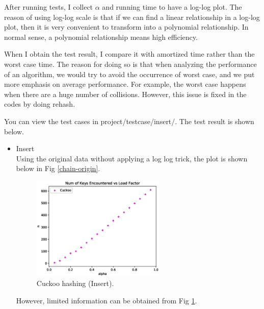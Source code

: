 \documentclass{article}
\begin{document}
\begin{spacing}{1.2}
After running tests, I collect $\alpha$ and running time to have a log-log plot. The reason of using log-log scale is that if we can find a linear relationship in a log-log plot, then it is very convenient to transform into a polynomial relationship. In normal sense, a polynomial relationship means high efficiency.

When I obtain the test result, I compare it with amortized time rather than the worst case time. The reason for doing so is that when analyzing the performance of an algorithm, we would try to avoid the occurrence of worst case, and we put more emphasis on average performance. For example, the worst case happens when there are a huge number of collisions. However, this issue is fixed in the codes by doing rehash.  

You can view the test cases in project/testcase/insert/. The test result is shown below.
\begin{itemize}
    \item Insert\\
    Using the original data without applying a log log trick, the plot is shown below in Fig \ref{chain-origin}.
    \begin{figure}[!htb]
        \centering
        \includegraphics[width=0.6\textwidth]{../output/fig/insert_original_cuckoo.eps}
        \caption{Cuckoo hashing (Insert).}
        \label{cuckoo-origin}
    \end{figure}

    However, limited information can be obtained from Fig \ref{cuckoo-origin}.


\end{itemize}
\end{spacing}
\end{document}
